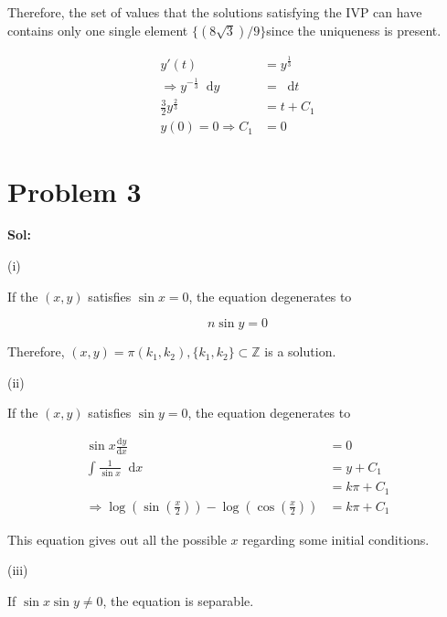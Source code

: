 \documentclass[utf8]{ctexart}
\newcommand{\dif}{\mathop{}\!\mathrm{d}}
\begin{document}
Therefore, the set of values that the solutions satisfying the IVP can have contains only one single element \(\{(8\sqrt{3})/9\}\)since the uniqueness is present.

\begin{equation}
	\begin{aligned}
		y'(t)                               & =y^{\frac{1}{3}} \\
		\Rightarrow y^{- \frac{1}{3}}\dif y & =\dif t          \\
		\frac{3}{2}y^{\frac{2}{3}}          & =t+C_1           \\
		y(0)=0\Rightarrow C_1               & =0
	\end{aligned}
\end{equation}

\section{Problem 3}

\textbf{Sol:}

(i)

If the \((x,y)\) satisfies \(\sin x =0\), the equation degenerates to

\begin{equation}
	n\sin y=0
\end{equation}

Therefore, \((x,y)=\pi(k_1,k_2),\{k_1,k_2\}\subset \mathbb{Z}\) is a solution.

(ii)

If the \((x,y)\) satisfies \(\sin y=0\), the equation degenerates to

\begin{equation}
	\begin{aligned}
		\sin x \frac{\mathrm{d}y}{\mathrm{d}x}           & =0         \\
		\int \frac{1}{\sin x}\dif x                      & =y+C_1     \\
		                                                 & =k \pi+C_1 \\
		\Rightarrow \log \left(\sin \left(\frac{x}{2}\right)\right)
		-\log \left(\cos \left(\frac{x}{2}\right)\right) & =k\pi+C_1
	\end{aligned}
\end{equation}

This equation gives out all the possible \(x\) regarding some initial conditions.

(iii)

If \(\sin x \sin y \not =0\), the equation is separable.
\end{document}
